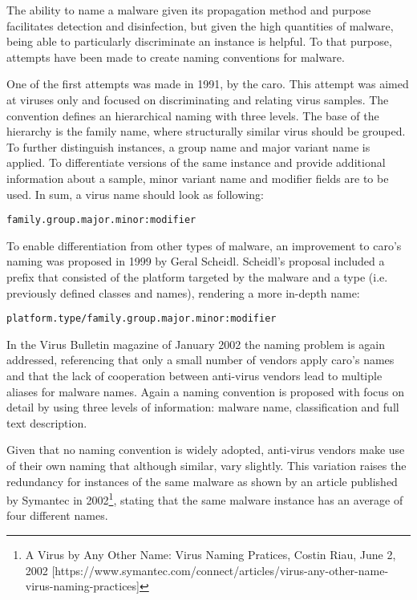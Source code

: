 The ability to name a malware given its propagation method and purpose facilitates detection and disinfection, but given the high quantities of malware, being able to particularly discriminate an instance is helpful. To that purpose, attempts have been made to create naming conventions for malware.

One of the first attempts was made in 1991, by the \gls{caro}\cite{caro:naming}. This attempt was aimed at viruses only and focused on discriminating and relating virus samples. The convention defines an hierarchical naming with three levels. The base of the hierarchy is the family name, where structurally similar virus should be grouped. To further distinguish instances, a group name and major variant name is applied. To differentiate versions of the same instance and provide additional information about a sample, minor variant name and modifier fields are to be used. In sum, a virus name should look as following:

\begin{center}\texttt{family.group.major.minor:modifier}\end{center}

To enable differentiation from other types of malware, an improvement to \gls{caro}'s naming was proposed in 1999 by Geral Scheidl\cite{scheidl:naming}. Scheidl's proposal included a prefix that consisted of the platform targeted by the malware and a type (i.e. previously defined classes and names), rendering a more in-depth name:

\begin{center}\texttt{platform.type/family.group.major.minor:modifier}\end{center}

In the Virus Bulletin magazine of January 2002\cite{virus_bulletin} the naming problem is again addressed, referencing that only a small number of vendors apply \gls{caro}'s names and that the lack of cooperation between anti-virus vendors lead to multiple aliases for malware names. Again a naming convention is proposed with focus on detail by using three levels of information: malware name, classification and full text description.

Given that no naming convention is widely adopted, anti-virus vendors make use of their own naming that although similar, vary slightly. This variation raises the redundancy for instances of the same malware as shown by an article published by Symantec in 2002\footnote{A Virus by Any Other Name: Virus Naming Pratices, Costin Riau, June 2, 2002 [https://www.symantec.com/connect/articles/virus-any-other-name-virus-naming-practices]}, stating that the same malware instance has an average of four different names.

